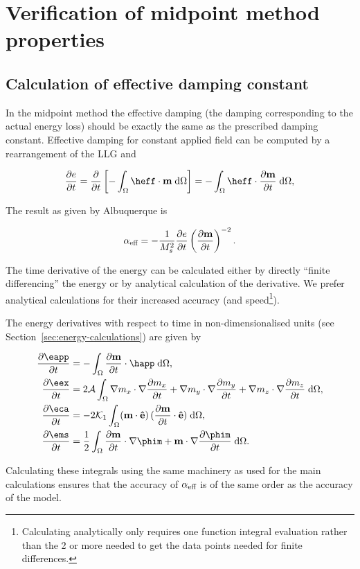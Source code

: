 
\section{Verification of midpoint method properties}

\subsection{Calculation of effective damping constant}
\label{sec:exact-damp-const}

In the midpoint method the effective damping (\ie the damping corresponding to the actual energy loss) should be exactly the same as the prescribed damping constant.
Effective damping for constant applied field can be computed by a rearrangement of the LLG and

\begin{equation}
  \pd{e}{t} = \pd{}{t} \left[ - \int_\magd \heff \cdot \mv \d \magd \right] = - \int_\magd \heff \cdot \pd{\mv}{t} \d \magd,
\end{equation}

The result as given by Albuquerque \etal \cite{Albuquerque2001} is

\begin{equation}
  \alpha_\text{eff} = - \frac{1}{M_s^2} \frac{\partial e}{\partial t}  \left( \frac{\partial \mathbf{m}}{\partial t} \right)^{-2}.
\end{equation}


The time derivative of the energy can be calculated either by directly ``finite differencing'' the energy or by analytical calculation of the derivative.
We prefer analytical calculations for their increased accuracy (and speed\footnote{Calculating analytically only requires one function integral evaluation rather than the 2 or more needed to get the data points needed for finite differences.}).

The energy derivatives with respect to time in non-dimensionalised units (see Section~\ref{sec:energy-calculations}) are given by

\begin{align}
  \pd{\eapp}{t} &= - \int_\magd \pd{\mv}{t} \cdot \happ \d\magd, \\
  \pd{\eex}{t} &= 2 \exchc \int_\magd \nabla m_x \cdot \nabla \pd{m_x}{t}
           + \nabla m_y \cdot \nabla \pd{m_y}{t}
           + \nabla m_z \cdot \nabla \pd{m_z}{t} \d\magd, \\
  \pd{\eca}{t} &= - 2 \kone \int_\magd (\mv \cdot \ev )\, (\pd{\mv}{t} \cdot \ev) \d\magd, \\
  \pd{\ems}{t} &= \frac{1}{2} \int_\magd \pd{\mv}{t} \cdot \nabla \phim
       + \mv \cdot \nabla \pd{\phim}{t} \d\magd.
\end{align}

Calculating these integrals using the same machinery as used for the main calculations ensures that the accuracy of $\alpha_\text{eff}$ is of the same order as the accuracy of the model.

